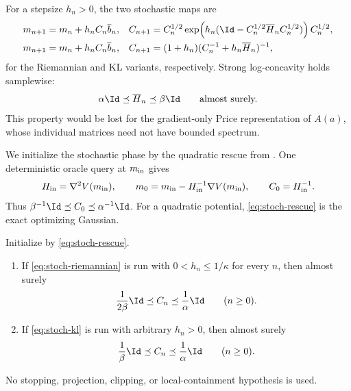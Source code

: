 For a stepsize \(h_n>0\), the two stochastic maps are
\begin{align}
  m_{n+1}&=m_n+h_nC_n\overline b_n,
  &
  C_{n+1}
  &=C_n^{1/2}\exp\!\left(
    h_n(\Id-C_n^{1/2}\overline H_nC_n^{1/2})
  \right)C_n^{1/2},
  \label{eq:stoch-riemannian}\\
  m_{n+1}&=m_n+h_nC_n\overline b_n,
  &
  C_{n+1}
  &=(1+h_n)(C_n^{-1}+h_n\overline H_n)^{-1},
  \label{eq:stoch-kl}
\end{align}
for the Riemannian and KL variants, respectively.  Strong log-concavity
holds samplewise:
\begin{equation}
  \alpha\Id\preceq\overline H_n\preceq\beta\Id
  \qquad\text{almost surely.}
  \label{eq:stoch-sampled-band}
\end{equation}
This property would be lost for the gradient-only Price representation of
\(A(a)\), whose individual matrices need not have bounded spectrum.

We initialize the stochastic phase by the quadratic rescue from
.  One deterministic oracle query at \(m_{\rm in}\) gives
\begin{equation}
  H_{\rm in}=\nabla^2V(m_{\rm in}),
  \qquad
  m_0=m_{\rm in}-H_{\rm in}^{-1}\nabla V(m_{\rm in}),
  \qquad
  C_0=H_{\rm in}^{-1}.
  \label{eq:stoch-rescue}
\end{equation}
Thus \(\beta^{-1}\Id\preceq C_0\preceq\alpha^{-1}\Id\).
For a quadratic potential, \eqref{eq:stoch-rescue} is the exact optimizing
Gaussian.

\begin{proposition}
\label{prop:stoch-covariance-bands}
Initialize by \eqref{eq:stoch-rescue}.
\begin{enumerate}[label=\textup{(\roman*)}]
\item If \eqref{eq:stoch-riemannian} is run with
  \(0<h_n\leq1/\kappa\) for every \(n\), then almost surely
  \[
    \frac1{2\beta}\Id\preceq C_n\preceq\frac1\alpha\Id
    \qquad(n\geq0).
  \]
\item If \eqref{eq:stoch-kl} is run with arbitrary \(h_n>0\), then almost
  surely
  \[
    \frac1\beta\Id\preceq C_n\preceq\frac1\alpha\Id
    \qquad(n\geq0).
  \]
\end{enumerate}
No stopping, projection, clipping, or local-containment hypothesis is used.
\end{proposition}

